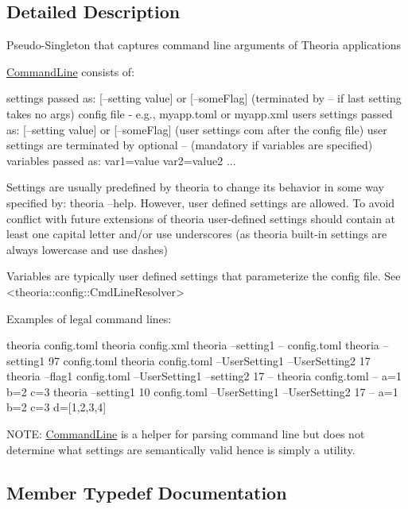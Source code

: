 \subsection{Detailed Description}
Pseudo-\/\+Singleton that captures command line arguments of Theoria applications

\hyperlink{classtheoria_1_1util_1_1CommandLine}{Command\+Line} consists of\+: \begin{DoxyVerb} settings passed as: [--setting value] or [--someFlag] (terminated by -- if last setting takes no args)
 config file - e.g., myapp.toml or myapp.xml
 users settings passed as: [--setting value] or [--someFlag] (user settings com after the config file)
 user settings are terminated by optional -- (mandatory if variables are specified)
 variables passed as: var1=value var2=value2 ...

 Settings are usually predefined by theoria to change its behavior in some way specified by: theoria --help.
 However, user defined settings are allowed. To avoid conflict with future extensions of theoria
 user-defined settings should contain at least one capital letter and/or use underscores (as theoria built-in settings are always
 lowercase and use dashes)


 Variables are typically user defined settings that parameterize the config file. 
 See <theoria::config::CmdLineResolver>
\end{DoxyVerb}


Examples of legal command lines\+: \begin{DoxyVerb} theoria config.toml
 theoria config.xml
 theoria --setting1 -- config.toml
 theoria --setting1 97 config.toml 
 theoria config.toml --UserSetting1 --UserSetting2 17
 theoria --flag1 config.toml --UserSetting1 --setting2 17 --
 theoria config.toml -- a=1 b=2 c=3
 theoria --setting1 10 config.toml --UserSetting1 --UserSetting2 17 -- a=1 b=2 c=3 d=[1,2,3,4]
\end{DoxyVerb}


N\+O\+TE\+: \hyperlink{classtheoria_1_1util_1_1CommandLine}{Command\+Line} is a helper for parsing command line but does not determine what settings are semantically valid hence is simply a utility. 

\subsection{Member Typedef Documentation}
\mbox{\label{classtheoria_1_1util_1_1CommandLine_a729aa00feedd8257d4caafc73ac6ee63}} 
